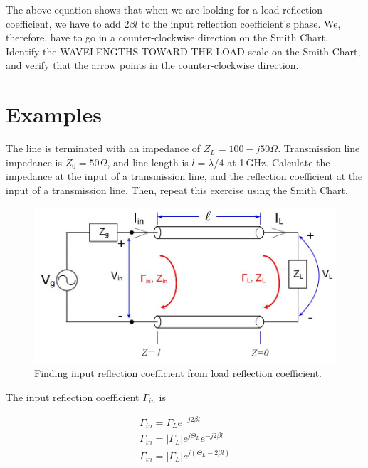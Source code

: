 \documentclass{ximera}
\begin{document}
The above equation shows that when we are looking for a load reflection coefficient, we have to add $2 \beta l$ to the input reflection coefficient's phase. We, therefore, have to go in a counter-clockwise direction on the Smith Chart. Identify the WAVELENGTHS TOWARD THE LOAD scale on the Smith Chart, and 
verify that the arrow points in the counter-clockwise direction. 


\section{Examples}

\begin{example}


The line is terminated with an impedance of $Z_L= 100-j50 \Omega$. Transmission line impedance is $Z_0=50 \Omega$, and line length is $l=\lambda/4$ at 1\,GHz. Calculate the impedance at the input of a transmission line, and  the
reflection coefficient at the input of a transmission line.
Then, repeat this exercise using the Smith Chart.


\begin{figure}[htbp]
\begin{center}
\includegraphics[scale=0.6]{../jpg/trline.jpg}
\end{center}
\caption{Finding input reflection coefficient from load reflection coefficient.}
\label{fig:SCImpRefExample1SchDia}
\end{figure}

\begin{explanation}

The input reflection coefficient $\Gamma_{in}$ is 

\begin{eqnarray}
\Gamma_{in}=\Gamma_L e^{-j2 \beta l} \\
\Gamma_{in} = |\Gamma_L| e^{j \Theta_{L}} e^{-j2 \beta l} \\
\Gamma_{in} = |\Gamma_L| e^{j(\Theta_{L} -2 \beta l) } 
\end{eqnarray}


\end{explanation}
\end{example}
\end{document}
